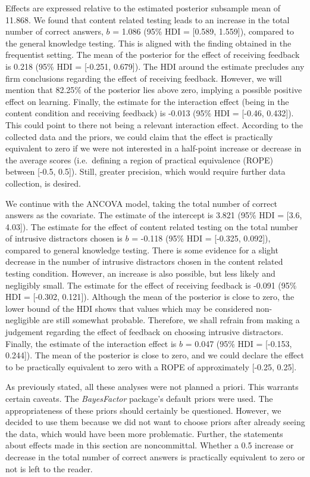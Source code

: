 \documentclass[11pt,]{article}
\begin{document}
Effects are expressed relative to the estimated posterior subsample mean
of 11.868. We found that content related testing leads to an increase in
the total number of correct answers, \(b\) = 1.086 (95\% HDI = {[}0.589,
1.559{]}), compared to the general knowledge testing. This is aligned
with the finding obtained in the frequentist setting. The mean of the
posterior for the effect of receiving feedback is 0.218 (95\% HDI =
{[}-0.251, 0.679{]}). The HDI around the estimate precludes any firm
conclusions regarding the effect of receiving feedback. However, we will
mention that 82.25\% of the posterior lies above zero, implying a
possible positive effect on learning. Finally, the estimate for the
interaction effect (being in the content condition and receiving
feedback) is -0.013 (95\% HDI = {[}-0.46, 0.432{]}). This could point to
there not being a relevant interaction effect. According to the
collected data and the priors, we could claim that the effect is
practically equivalent to zero if we were not interested in a half-point
increase or decrease in the average scores (i.e.~defining a region of
practical equivalence (ROPE) between {[}-0.5, 0.5{]}). Still, greater
precision, which would require further data collection, is desired.

We continue with the ANCOVA model, taking the total number of correct
answers as the covariate. The estimate of the intercept is 3.821 (95\%
HDI = {[}3.6, 4.03{]}). The estimate for the effect of content related
testing on the total number of intrusive distractors chosen is \(b\) =
-0.118 (95\% HDI = {[}-0.325, 0.092{]}), compared to general knowledge
testing. There is some evidence for a slight decrease in the number of
intrusive distractors chosen in the content related testing condition.
However, an increase is also possible, but less likely and negligibly
small. The estimate for the effect of receiving feedback is -0.091 (95\%
HDI = {[}-0.302, 0.121{]}). Although the mean of the posterior is close
to zero, the lower bound of the HDI shows that values which may be
considered non-negligible are still somewhat probable. Therefore, we
shall refrain from making a judgement regarding the effect of feedback
on choosing intrusive distractors. Finally, the estimate of the
interaction effect is \(b\) = 0.047 (95\% HDI = {[}-0.153, 0.244{]}).
The mean of the posterior is close to zero, and we could declare the
effect to be practically equivalent to zero with a ROPE of approximately
{[}-0.25, 0.25{]}.

As previously stated, all these analyses were not planned a priori. This
warrants certain caveats. The \textit{BayesFactor} package's default
priors were used. The appropriateness of these priors should certainly
be questioned. However, we decided to use them because we did not want
to choose priors after already seeing the data, which would have been
more problematic. Further, the statements about effects made in this
section are noncommittal. Whether a 0.5 increase or decrease in the
total number of correct answers is practically equivalent to zero or not
is left to the reader.



\end{document}
